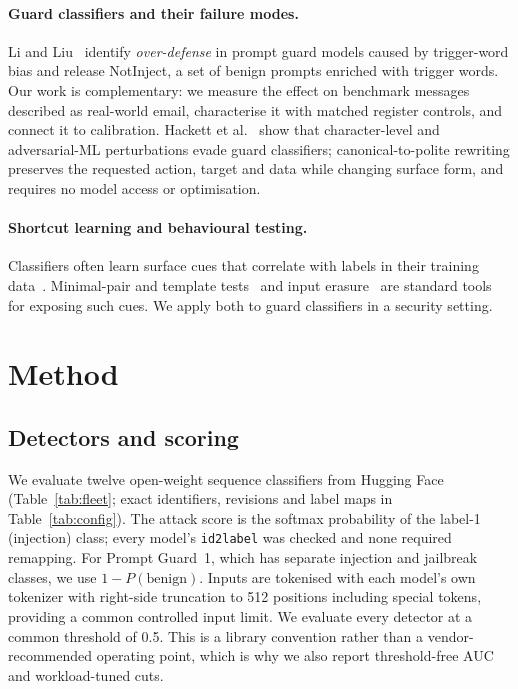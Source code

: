 \documentclass[11pt]{article}
\begin{document}
\paragraph{Guard classifiers and their failure modes.}
Li and Liu~\cite{li2024injecguard} identify \emph{over-defense} in prompt guard models caused by trigger-word bias and release NotInject, a set of benign prompts enriched with trigger words. Our work is complementary: we measure the effect on benchmark messages described as real-world email, characterise it with matched register controls, and connect it to calibration. Hackett et al.~\cite{hackett2025bypassing} show that character-level and adversarial-ML perturbations evade guard classifiers; canonical-to-polite rewriting preserves the requested action, target and data while changing surface form, and requires no model access or optimisation.

\paragraph{Shortcut learning and behavioural testing.}
Classifiers often learn surface cues that correlate with labels in their training data~\cite{gururangan2018,mccoy2019,geirhos2020}. Minimal-pair and template tests~\cite{ribeiro2020checklist} and input erasure~\cite{li2016erasure} are standard tools for exposing such cues. We apply both to guard classifiers in a security setting.

\section{Method}

\subsection{Detectors and scoring}
We evaluate twelve open-weight sequence classifiers from Hugging Face (Table~\ref{tab:fleet}; exact identifiers, revisions and label maps in Table~\ref{tab:config}). The attack score is the softmax probability of the label-1 (injection) class; every model's \texttt{id2label} was checked and none required remapping. For Prompt Guard~1, which has separate injection and jailbreak classes, we use $1 - P(\text{benign})$. Inputs are tokenised with each model's own tokenizer with right-side truncation to 512 positions including special tokens, providing a common controlled input limit. We evaluate every detector at a common threshold of 0.5. This is a library convention rather than a vendor-recommended operating point, which is why we also report threshold-free AUC and workload-tuned cuts.
\end{document}
